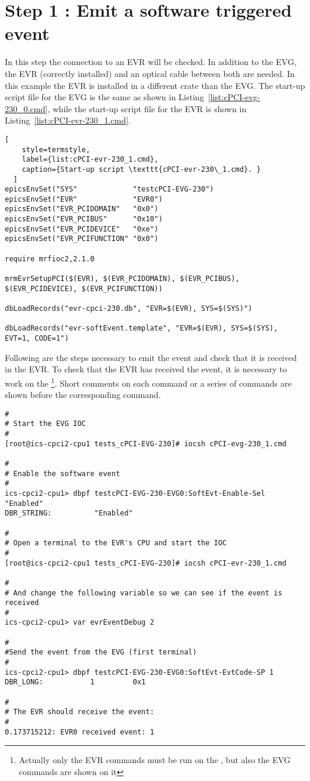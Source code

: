 \documentclass[11pt
  , a4paper
  , article
  , oneside
  , showtrims
]{memoir}
\begin{document}
\section{Step 1 : Emit a software triggered event}
In this step the connection to an EVR will be checked. In addition to the EVG, the EVR (correctly installed) and an optical cable between both are needed. In this example the EVR is installed in a different crate than the EVG. The start-up script file for the EVG is the same as shown in Listing~\ref{list:cPCI-evg-230_0.cmd}, while the start-up script file for the EVR is shown in Listing~\ref{list:cPCI-evr-230_1.cmd}.

\begin{lstlisting}[
    style=termstyle,
    label={list:cPCI-evr-230_1.cmd},
    caption={Start-up script \texttt{cPCI-evr-230\_1.cmd}. }
  ]
epicsEnvSet("SYS"             "testcPCI-EVG-230")
epicsEnvSet("EVR"             "EVR0")
epicsEnvSet("EVR_PCIDOMAIN"   "0x0")
epicsEnvSet("EVR_PCIBUS"      "0x10")
epicsEnvSet("EVR_PCIDEVICE"   "0xe")
epicsEnvSet("EVR_PCIFUNCTION" "0x0")

require mrfioc2,2.1.0

mrmEvrSetupPCI($(EVR), $(EVR_PCIDOMAIN), $(EVR_PCIBUS), $(EVR_PCIDEVICE), $(EVR_PCIFUNCTION))

dbLoadRecords("evr-cpci-230.db", "EVR=$(EVR), SYS=$(SYS)")

dbLoadRecords("evr-softEvent.template", "EVR=$(EVR), SYS=$(SYS), EVT=1, CODE=1")
\end{lstlisting}

Following are the steps necessary to emit the event and check that it is received in the EVR. To check that the EVR has received the event, it is necessary to work on the \footnote{Actually only the EVR commands must be run on the , but also the EVG commands are shown on it}. Short comments on each command or a series of commands are shown before the corresponding command.

\begin{lstlisting}[style=termstyle]
#
# Start the EVG IOC
#
[root@ics-cpci2-cpu1 tests_cPCI-EVG-230]# iocsh cPCI-evg-230_1.cmd

#
# Enable the software event
#
ics-cpci2-cpu1> dbpf testcPCI-EVG-230-EVG0:SoftEvt-Enable-Sel "Enabled"
DBR_STRING:          "Enabled"
  
#
# Open a terminal to the EVR's CPU and start the IOC
#
[root@ics-cpci2-cpu1 tests_cPCI-EVG-230]# iocsh cPCI-evr-230_1.cmd

#
# And change the following variable so we can see if the event is received
#
ics-cpci2-cpu1> var evrEventDebug 2

#
#Send the event from the EVG (first terminal)
#
ics-cpci2-cpu1> dbpf testcPCI-EVG-230-EVG0:SoftEvt-EvtCode-SP 1
DBR_LONG:           1         0x1

#
# The EVR should receive the event:
#
0.173715212: EVR0 received event: 1
\end{lstlisting}
\end{document}
